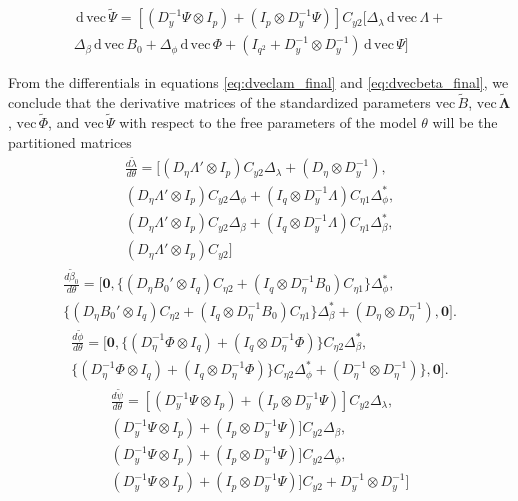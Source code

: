 \documentclass[a4paper, 11pt]{article}
\newcommand{\n}{\eta}
\renewcommand{\l}{\lambda}
\renewcommand{\b}{\beta}
\newcommand{\p}{\phi}
\renewcommand{\d}{\,\mathrm{d}\,}
\newcommand{\kronprod}{\otimes}
\renewcommand{\vec}{\mathrm{vec}\,}
\newcommand{\Lambdastan}{\boldsymbol{\tilde{\Lambda}}}
\newcommand{\Bstan}{\tilde{B}}
\newcommand{\Phistan}{\tilde{\Phi}}
\newcommand{\Psistan}{\tilde{\Psi}}
\newcommand{\0}{\boldsymbol{0}}
\begin{document}
\begin{equation}\label{eq:dvecpsi_final}
\begin{split}
  \d\vec \Psistan = 
   [(D^{-1}_y \Psi \kronprod I_p)  + (I_p \kronprod D_y^{-1}\Psi)  ]  C_{y2} 
   [
   \Delta_\l \d\vec\Lambda +\\
   \Delta_\b         \d\vec B_0 +
   \Delta_\p         \d\vec \Phi +
   (I_{q^2}  + D^{-1}_y \kronprod D^{-1}_y) \d\vec \Psi
   ]
\end{split}\end{equation}
\fi

From the differentials in equations \ref{eq:dveclam_final} and
\ref{eq:dvecbeta_final},
we conclude that the derivative matrices  of the standardized parameters $\vec \Bstan$, 
$\vec \Lambdastan$, $\vec \Phistan$, and $\vec \Psistan$ with respect to the free 
parameters of the model $\theta$ will be the partitioned matrices
\begin{multline}\label{eq:dlambda}
\frac{d \tilde\l}{d \theta} = [
        (D_\n \Lambda' \kronprod I_p) C_{y2} \Delta_\l + 
            (D_\n \kronprod D_y^{-1}), \\
        (D_\n \Lambda' \kronprod I_p) C_{y2} \Delta_\p +
         (I_q \kronprod D_y^{-1}\Lambda) C_{\n1} \Delta^*_\p, \\
        (D_\n \Lambda' \kronprod I_p) C_{y2} \Delta_\b + 
            (I_q \kronprod D_y^{-1}\Lambda) C_{\n1} \Delta^*_\b,\\
        (D_\n \Lambda' \kronprod I_p) C_{y2}  
 ] 
\end{multline}
\begin{multline}\label{eq:dbeta}
\frac{d \tilde\b_0}{d \theta} = [
        \0,
         \{(D_\n B_0' \kronprod I_q) C_{\n2}  + 
            (I_q \kronprod D_\n^{-1}B_0) C_{\n1} \} \Delta^*_\p
            ,\\
         \{(D_\n B_0' \kronprod I_q) C_{\n2}  + 
            (I_q \kronprod D_\n^{-1}B_0) C_{\n1} \} \Delta^*_\b +
            (D_\n \kronprod D_\n^{-1})
            ,
        \0
 ] .
\end{multline}
\begin{multline}\label{eq:dphi}
\frac{d \tilde{\phi}}{d \theta} = [
\0,
      \{ (D^{-1}_\n \Phi \kronprod I_q)  + (I_q \kronprod D_\n^{-1}\Phi)  \} C_{\n2} \Delta^*_\b        
     ,\\
      \{(D^{-1}_\n \Phi \kronprod I_q)  + (I_q \kronprod D_\n^{-1}\Phi)  \}  C_{\n2} \Delta^*_\p   +    (D_\n^{-1} \kronprod D_\n^{-1})
     \}
              ,
        \0
 ] .
\end{multline}
\newcommand{\F}{(D^{-1}_y \Psi \kronprod I_p)  + (I_p \kronprod D_y^{-1}\Psi)  ]  C_{y2}}
\begin{multline}\label{eq:dpsi}
\frac{d \tilde{\psi}}{d \theta} = [
\F   \Delta_\l  ,\\
\F   \Delta_\b         ,\\
\F   \Delta_\p          ,\\
 \F   + D^{-1}_y \kronprod D^{-1}_y
   ]
\end{multline}
\end{document}
